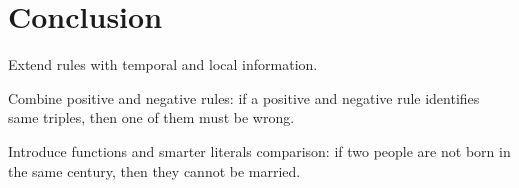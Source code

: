 \section{Conclusion}

Extend rules with temporal and local information.

Combine positive and negative rules: if a positive and negative rule identifies same triples, then one of them must be wrong.

Introduce functions and smarter literals comparison: if two people are not born in the same century, then they cannot be married.